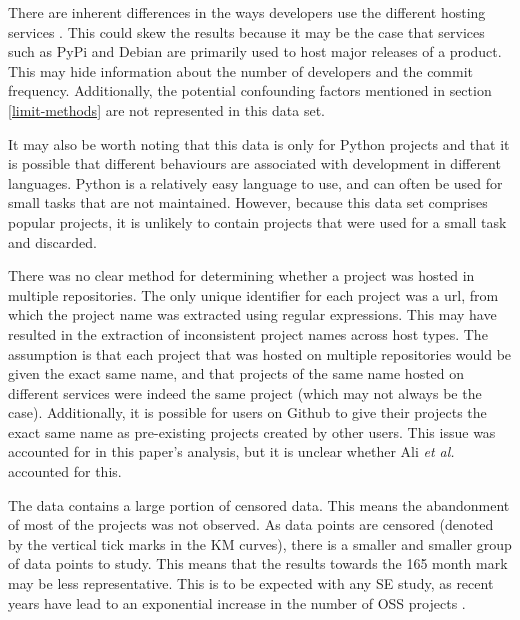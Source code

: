 \documentclass[acmconf]{acmart}
\begin{document}
There are inherent differences in the ways developers use the different hosting services .
This could skew the results because it may be the case that services such as PyPi and Debian are primarily used to host major releases of a product.
This may hide information about the number of developers and the commit frequency.
Additionally, the potential confounding factors mentioned in section \ref{limit-methods} are not represented in this data set.

It may also be worth noting that this data is only for Python projects and that it is possible that different behaviours are associated with development in different languages.
Python is a relatively easy language to use, and can often be used for small tasks that are not maintained.
However, because this data set comprises popular projects, it is unlikely to contain projects that were used for a small task and discarded.

There was no clear method for determining whether a project was hosted in multiple repositories.
The only unique identifier for each project was a url, from which the project name was extracted using regular expressions.
This may have resulted in the extraction of inconsistent project names across host types.
The assumption is that each project that was hosted on multiple repositories would be given the exact same name, and that projects of the same name hosted on different services were indeed the same project (which may not always be the case).
Additionally, it is possible for users on Github to give their projects the exact same name as pre-existing projects created by other users.
This issue was accounted for in this paper's analysis, but it is unclear whether Ali \emph{et al.} accounted for this.

The data contains a large portion of censored data.
This means the abandonment of most of the projects was not observed.
As data points are censored (denoted by the vertical tick marks in the KM curves), there is a smaller and smaller group of data points to study.
This means that the results towards the 165 month mark may be less representative.
This is to be expected with any SE study, as recent years have lead to an exponential increase in the number of OSS projects .
\end{document}
